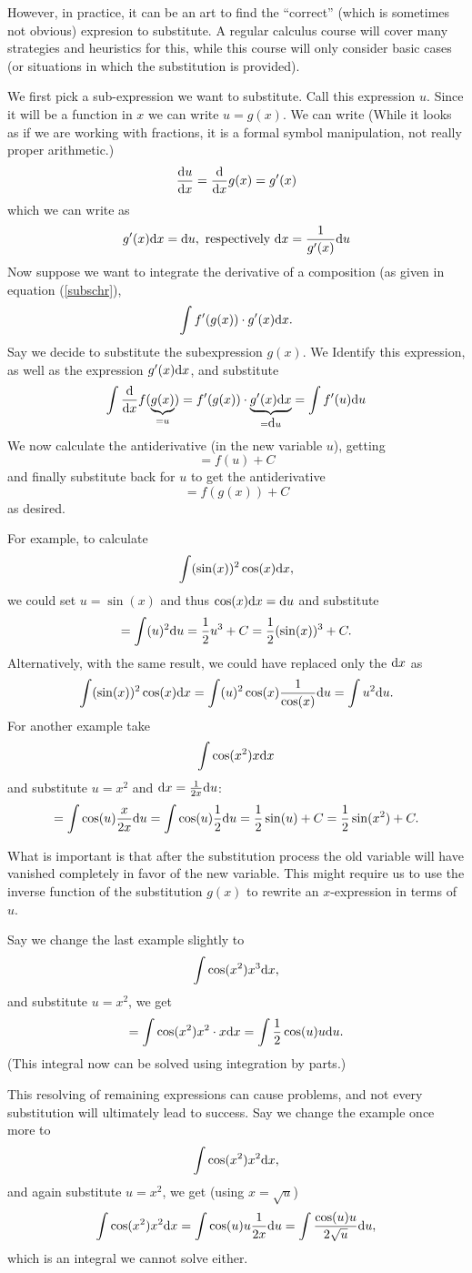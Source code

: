 However, in practice, it can be an art to
find the ``correct'' (which is sometimes not obvious) expresion to substitute. A
regular calculus course will cover many strategies and heuristics for this,
while this course will only consider basic cases (or situations in which the
substitution is provided).

We first pick a sub-expression we want to substitute. Call this expression
$u$. Since it will be a function in $x$ we can write $u=g(x)$. We can write
(While it looks as if we are working with fractions, it is a formal symbol
manipulation, not really proper arithmetic.)
\[
\frac{{\mbox{d}}u}{{\mbox{d}}x}=\frac{\mbox{d}}{\mbox{d}x} g(x)=g'(x)
\]
which we can write as
\[
g'(x){\mbox{d}}x={\mbox{d}}u,\mbox{\ respectively\ } {\mbox{d}}x=\frac{1}{g'(x)}{\mbox{d}}u
\]
Now suppose we want to integrate the derivative of a composition (as given
in equation (\ref{subschr}),
\[
\int f'(g(x))\cdot g'(x){\mbox{d}}x.
\]
Say we decide to substitute the subexpression $g(x)$. We Identify this
expression, as well as the expression $g'(x){\mbox{d}}x$, and substitute
\[
\int \frac{\mbox{d}}{\mbox{d}x} f(\underbrace{g(x)}_{=u})=f'(g(x))\cdot
\underbrace{g'(x){\mbox{d}}x}_{={\mbox{d}}u}=\int f'(u){\mbox{d}}u
\]
We now calculate the antiderivative (in the new variable $u$), getting
\[
=f(u)+C
\]
and finally substitute back for $u$ to get the antiderivative
\[
=f(g(x))+C
\]
as desired.

For example, to calculate
\[
\int (\sin(x))^2\cos(x){\mbox{d}}x,
\]
we could set $u=\sin(x)$ and thus $\cos(x){\mbox{d}}x={\mbox{d}}u$ and substitute
\[
=\int (u)^2{\mbox{d}}u=\frac12 u^3+C=\frac12 (\sin(x))^3+C.
\]
Alternatively, with the same result, we could have replaced only the ${\mbox{d}}x$ as
\[
\int (\sin(x))^2\cos(x){\mbox{d}}x=\int (u)^2\cos(x)\frac{1}{\cos(x)}{\mbox{d}}u=\int
u^2{\mbox{d}}u.
\]
For another example take
\[
\int \cos(x^2)x{\mbox{d}}x
\]
and substitute $u=x^2$ and ${\mbox{d}}x=\frac{1}{2x}{\mbox{d}}u$:
\[
=\int \cos(u)\frac{x}{2x}{\mbox{d}}u
=\int \cos(u)\frac{1}{2}{\mbox{d}}u=\frac12\sin(u)+C=\frac12\sin(x^2)+C.
\]
\smallskip

What is important is that after the substitution process 
the old variable will have vanished completely in favor of the new variable.
This might require us to use the inverse function of the substitution $g(x)$
to rewrite an $x$-expression in terms of $u$.

Say we change the last example slightly to
\[
\int\cos(x^2)x^3{\mbox{d}}x,
\]
and substitute $u=x^2$, we get
\[
=\int\cos(x^2) x^2\cdot x{\mbox{d}}x=\int\frac12 \cos(u)u{\mbox{d}}u.
\]
(This integral now can be solved using integration by parts.)

This resolving of remaining expressions can cause problems, and not every
substitution will ultimately lead to success. Say we change the example once
more to
\[
\int\cos(x^2)x^2{\mbox{d}}x,
\]
and again substitute $u=x^2$, we get (using $x=\sqrt{u}$)
\[
\int\cos(x^2) x^2 {\mbox{d}}x=\int\cos(u)u\frac{1}{2x}{\mbox{d}}u
=\int\frac{\cos(u)u}{2\sqrt{u}}{\mbox{d}}u,
\]
which is an integral we cannot solve either.
\smallskip

